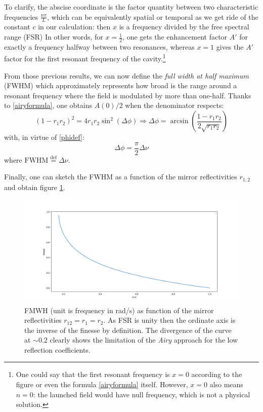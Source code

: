 \documentclass[11pt]{report}
\begin{document}
To clarify, the abscise coordinate is the factor quantity between two characteristic frequencies $\frac{n\pi}{L}$, which can be equivalently spatial or temporal as we get ride of the constant $c$ in our calculation: then $x$ is a frequency divided by the free spectral range (FSR) In other words, for $x=\frac{1}{2}$, one gets the enhancement factor $A'$ for exactly a frequency halfway between two resonances, whereas $x=1$ gives the $A'$ factor for the first resonant frequency of the cavity.\footnote{One could say that the first resonant frequency is $x=0$ according to the figure or even the formula \eqref{airyformula} itself. However, $x=0$ also means $n=0$: the launched field would have null frequency, which is not a physical solution.}

From those previous results, we can now define the \textit{full width at half maximum} (FWHM) which approximately represents how broad is the range around a resonant frequency where the field is modulated by more than one-half. Thanks to \eqref{airyformula}, one obtains $ A(0) / 2$ when the denominator respects:
\begin{equation}
(1 - r_1 r_2)^2 = 4 r_1 r_2 \sin^2(\Delta\phi) \Rightarrow \Delta\phi = \arcsin \left(\frac{1 - r_1 r_2}{2\sqrt{r_1r_2}} \right)
\end{equation}
with, in virtue of \eqref{phidef}:
\begin{equation}
\Delta\phi = \frac{\pi}{2}\Delta\nu
\end{equation}
where $\textrm{FWHM} \stackrel{\text{def}}{=} \Delta\nu$.

Finally, one can sketch the FWHM as a function of the mirror reflectivities $r_{1,2}$ and obtain figure \ref{fig:airy-fmwh}.

\begin{figure}[h]
\centering
\includegraphics[width=\textwidth]{airy-fmwh}
\caption{FMWH (unit is frequency in rad/s) as function of the mirror reflectivities $r_{12} = r_1 = r_2$. As FSR is unity then the ordinate axis is the inverse of the finesse by definition. The divergence of the curve at $\sim 0.2$ clearly shows the limitation of the \textit{Airy} approach for the low reflection coefficients.}
\label{fig:airy-fmwh}
\end{figure}
\end{document}
